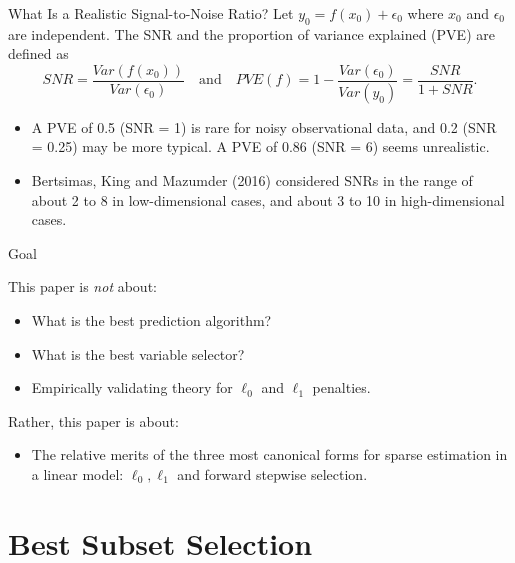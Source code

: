 \documentclass[blue, 10pt]{beamer}
\begin{document}
\begin{frame}{What Is a Realistic Signal-to-Noise Ratio?}
  Let  $y_0 = f(x_0) + \epsilon_0$ where $x_0$ and $\epsilon_0$ are independent. The SNR and the proportion of variance explained (PVE) are defined as
  $$SNR = \frac{Var(f(x_0))}{Var(\epsilon_0)} \quad \text{and} \quad PVE(f) = 1 - \frac{Var(\epsilon_0)}{Var(y_0)} = \frac{SNR}{1 + SNR}.$$

  \begin{itemize}
    \item A PVE of 0.5 (SNR = 1) is rare for noisy observational data, and 0.2 (SNR = 0.25) may be more typical. A PVE of 0.86 (SNR = 6) seems unrealistic.
    \item Bertsimas, King and Mazumder (2016) considered SNRs in the range of about 2 to 8 in low-dimensional cases, and about 3 to 10 in high-dimensional cases.
  \end{itemize}
    
\end{frame}


\begin{frame}{Goal}
  
  This paper is \textit{not} about:
    \begin{itemize}
      \item What is the best prediction algorithm?
      \item What is the best variable selector?
      \item Empirically validating theory for $\ell_0$ and $\ell_1$ penalties.
    \end{itemize}

  Rather, this paper is about:
    \begin{itemize}
      \item The relative merits of the three most canonical forms for sparse estimation in a linear model: $\ell_0, \ell_1$ and forward stepwise selection.
    \end{itemize}
    
\end{frame}


\section{Best Subset Selection}
\end{document}
